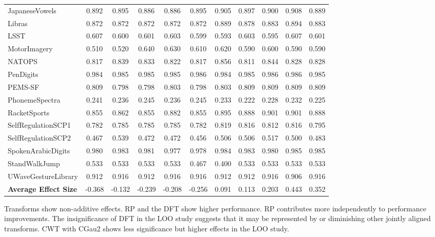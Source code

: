 \documentclass{article}
\begin{document}
\begin{table}[h]
{\begin{tabular}{lcccccccccc}
    JapaneseVowels & 0.892 & 0.895 & 0.886 & 0.886 & 0.895 & 0.905 & 0.897 & 0.900 & 0.908 & 0.889 \\
    Libras & 0.872 & 0.872 & 0.872 & 0.872 & 0.872 & 0.889 & 0.878 & 0.883 & 0.894 & 0.883 \\
    LSST & 0.607 & 0.600   & 0.601 & 0.603 & 0.599 & 0.593 & 0.603 & 0.595 & 0.607 & 0.601 \\
    MotorImagery & 0.510 & 0.520 & 0.640 & 0.630 & 0.610 & 0.620 & 0.590 & 0.600 & 0.590 & 0.590 \\
    NATOPS & 0.817 & 0.839 & 0.833 & 0.822 & 0.817 & 0.856 & 0.811 & 0.844 & 0.828 & 0.828 \\
    PenDigits & 0.984 & 0.985 & 0.985 & 0.985 & 0.986 & 0.984 & 0.985 & 0.986 & 0.986 & 0.985 \\
    PEMS-SF & 0.809 & 0.798 & 0.798 & 0.803 & 0.798 & 0.803 & 0.809 & 0.809 & 0.809 & 0.809 \\
    PhonemeSpectra & 0.241 & 0.236 & 0.245 & 0.236 & 0.245 & 0.233 & 0.222 & 0.228 & 0.232 & 0.225 \\
    RacketSports & 0.855 & 0.862 & 0.855 & 0.882 & 0.855 & 0.895 & 0.888 & 0.901 & 0.901 & 0.888 \\
    SelfRegulationSCP1 & 0.782 & 0.785 & 0.785 & 0.785 & 0.782 & 0.819 & 0.816 & 0.812 & 0.816 & 0.795 \\
    SelfRegulationSCP2 & 0.467 & 0.539 & 0.472 & 0.472 & 0.456 & 0.506 & 0.506 & 0.517 & 0.500 & 0.483 \\
    SpokenArabicDigits & 0.980 & 0.983 & 0.981 & 0.977 & 0.978 & 0.984 & 0.983 & 0.980 & 0.985 & 0.985 \\
    StandWalkJump & 0.533 & 0.533 & 0.533 & 0.533 & 0.467 & 0.400 & 0.533 & 0.533 & 0.533 & 0.533 \\
    UWaveGestureLibrary & 0.912 & 0.916 & 0.912 & 0.916 & 0.916 & 0.912 & 0.912 & 0.916 & 0.906 & 0.916 \\
    \midrule
    \textbf{Average Effect Size} & -0.368 & -0.132 & -0.239 & -0.208 & -0.256 & 0.091 & 0.113 & 0.203 & 0.443 & 0.352 \\
    \bottomrule
    \end{tabular}}
    \label{tab:performance_metrics}
\end{table}
    

Transforms show non-additive effects. RP and the DFT show higher performance. RP contributes more independently to performance improvements. The insignificance of DFT in the LOO study suggests that it may be represented by or diminishing other jointly aligned transforms. CWT with CGau2 shows less significance but higher effects in the LOO study.
\end{document}
